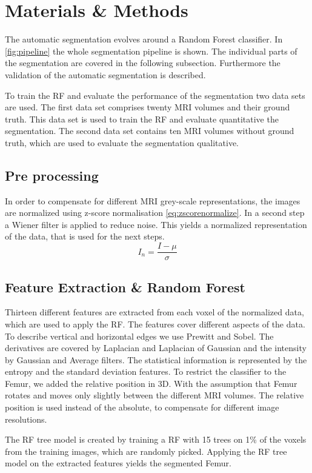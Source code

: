 \section{Materials \& Methods}
The automatic segmentation evolves around a Random Forest classifier. In \autoref{fig:pipeline} the whole segmentation pipeline is shown. The individual parts of the segmentation are covered in the following subsection. Furthermore the validation of the automatic segmentation is described.

To train the RF and evaluate the performance of the segmentation two data sets are used. The first data set comprises twenty MRI volumes and their ground truth. This data set is used to train the RF and evaluate quantitative the segmentation. The second data set contains ten MRI volumes without ground truth, which are used to evaluate the segmentation qualitative.
\subsection{Pre processing}
In order to compensate for different MRI grey-scale representations, the images are normalized using z-score normalisation  \autoref{eq:zscorenormalize}. In a second step a Wiener filter is applied to reduce noise. This yields a normalized representation of the data, that is used for the next steps.
\begin{equation}
I_n = \frac{I - \mu}{\sigma}
\label{eq:zscorenormalize}
\end{equation}
\subsection{Feature Extraction \& Random Forest}
Thirteen different features are extracted from each voxel of the normalized data, which are used to apply the RF. The features cover different aspects of the data. To describe vertical and horizontal edges we use Prewitt and Sobel. The derivatives are covered by Laplacian and Laplacian of Gaussian and the intensity by Gaussian and Average filters. The statistical information is represented by the entropy and the standard deviation features. To restrict the classifier to the Femur, we added the relative position in 3D. With the assumption that Femur rotates and moves only slightly between the different MRI volumes. The relative position is used instead of the absolute, to compensate for different image resolutions.

The RF tree model is created by training a RF with 15 trees on 1\% of the voxels from the training images, which are randomly picked. Applying the RF tree model on the extracted features yields the segmented Femur.
